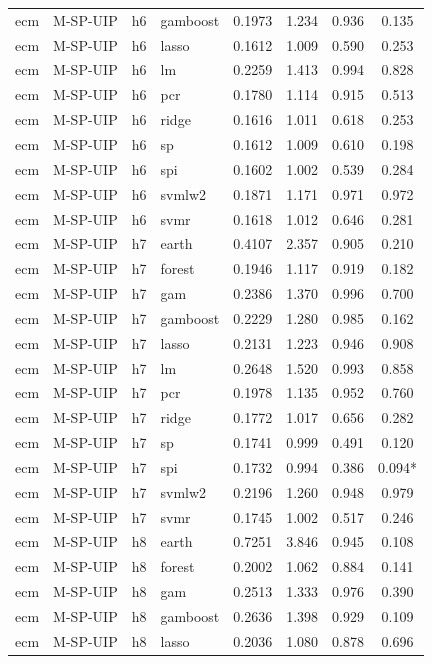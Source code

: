 \begin{ThreePartTable}
\begin{longtable}[t]{llclcccc}
ecm & M-SP-UIP & h6 & gamboost & 0.1973 & 1.234 & 0.936 & 0.135\\
ecm & M-SP-UIP & h6 & lasso & 0.1612 & 1.009 & 0.590 & 0.253\\
ecm & M-SP-UIP & h6 & lm & 0.2259 & 1.413 & 0.994 & 0.828\\
ecm & M-SP-UIP & h6 & pcr & 0.1780 & 1.114 & 0.915 & 0.513\\
ecm & M-SP-UIP & h6 & ridge & 0.1616 & 1.011 & 0.618 & 0.253\\
ecm & M-SP-UIP & h6 & sp & 0.1612 & 1.009 & 0.610 & 0.198\\
ecm & M-SP-UIP & h6 & spi & 0.1602 & 1.002 & 0.539 & 0.284\\
ecm & M-SP-UIP & h6 & svmlw2 & 0.1871 & 1.171 & 0.971 & 0.972\\
ecm & M-SP-UIP & h6 & svmr & 0.1618 & 1.012 & 0.646 & 0.281\\
\addlinespace
ecm & M-SP-UIP & h7 & earth & 0.4107 & 2.357 & 0.905 & 0.210\\
ecm & M-SP-UIP & h7 & forest & 0.1946 & 1.117 & 0.919 & 0.182\\
ecm & M-SP-UIP & h7 & gam & 0.2386 & 1.370 & 0.996 & 0.700\\
ecm & M-SP-UIP & h7 & gamboost & 0.2229 & 1.280 & 0.985 & 0.162\\
ecm & M-SP-UIP & h7 & lasso & 0.2131 & 1.223 & 0.946 & 0.908\\
ecm & M-SP-UIP & h7 & lm & 0.2648 & 1.520 & 0.993 & 0.858\\
ecm & M-SP-UIP & h7 & pcr & 0.1978 & 1.135 & 0.952 & 0.760\\
ecm & M-SP-UIP & h7 & ridge & 0.1772 & 1.017 & 0.656 & 0.282\\
ecm & M-SP-UIP & h7 & sp & 0.1741 & 0.999 & 0.491 & 0.120\\
ecm & M-SP-UIP & h7 & spi & 0.1732 & 0.994 & 0.386 & 0.094*\\
ecm & M-SP-UIP & h7 & svmlw2 & 0.2196 & 1.260 & 0.948 & 0.979\\
ecm & M-SP-UIP & h7 & svmr & 0.1745 & 1.002 & 0.517 & 0.246\\
\addlinespace
ecm & M-SP-UIP & h8 & earth & 0.7251 & 3.846 & 0.945 & 0.108\\
ecm & M-SP-UIP & h8 & forest & 0.2002 & 1.062 & 0.884 & 0.141\\
ecm & M-SP-UIP & h8 & gam & 0.2513 & 1.333 & 0.976 & 0.390\\
ecm & M-SP-UIP & h8 & gamboost & 0.2636 & 1.398 & 0.929 & 0.109\\
ecm & M-SP-UIP & h8 & lasso & 0.2036 & 1.080 & 0.878 & 0.696\\

\end{longtable}
\end{ThreePartTable}
